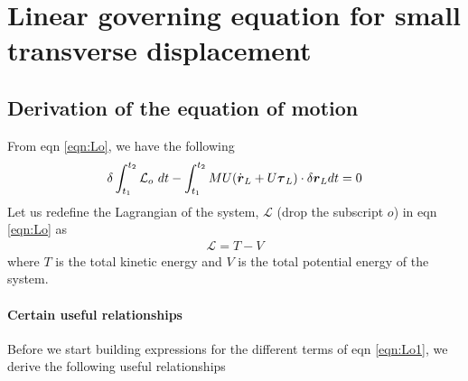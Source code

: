 \documentclass[12pt]{report}
\begin{document}
\chapter{Linear governing equation for small transverse displacement}\label{chap:3}

\section{Derivation of the equation of motion}
From eqn \ref{eqn:Lo}, we have the following
\begin{align*}
\delta \int_{t_1}^{t_2}\mathcal{L}_o~dt -  \int_{t_1}^{t_2}  MU (\dot{\vb*{r}}_L + U\vb*{\tau}_L)\cdot \delta\vb*{r}_L  dt = 0
\end{align*}
Let us redefine the Lagrangian of the system, $\mathcal{L}$ (drop the subscript $o$) in eqn \ref{eqn:Lo} as
\begin{align}
\mathcal{L} = T- V \label{eqn:Lo1}
\end{align}
where $T$ is the total kinetic energy  and $V$ is the total potential energy of the system. 

\subsubsection{Certain useful relationships}\label{subsec:relationships}
Before we start building expressions for the different terms of eqn \ref{eqn:Lo1}, we derive the following useful relationships
\end{document}
